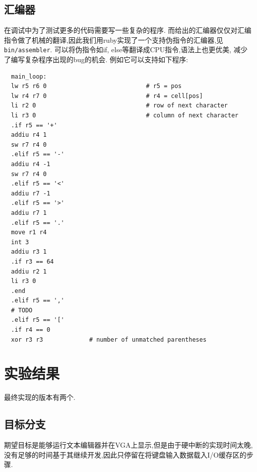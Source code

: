 \subsection{汇编器}
在调试中为了测试更多的代码需要写一些复杂的程序.
而给出的汇编器仅仅对汇编指令做了机械的翻译,因此我们用ruby实现了一个支持伪指令的汇编器,见\verb|bin/assembler|.
可以将伪指令如if, else等翻译成CPU指令,语法上也更优美, 减少了编写复杂程序出现的bug的机会. 例如它可以支持如下程序:
\begin{lstlisting}
  main_loop:
  lw r5 r6 0                            # r5 = pos
  lw r4 r7 0                            # r4 = cell[pos]
  li r2 0                               # row of next character
  li r3 0                               # column of next character
  .if r5 == '+'
  addiu r4 1
  sw r7 r4 0
  .elif r5 == '-'
  addiu r4 -1
  sw r7 r4 0
  .elif r5 == '<'
  addiu r7 -1
  .elif r5 == '>'
  addiu r7 1
  .elif r5 == '.'
  move r1 r4
  int 3
  addiu r3 1
  .if r3 == 64
  addiu r2 1
  li r3 0
  .end
  .elif r5 == ','
  # TODO
  .elif r5 == '['
  .if r4 == 0
  xor r3 r3             # number of unmatched parentheses
\end{lstlisting}
\section{实验结果}
最终实现的版本有两个.
\subsection{目标分支}
期望目标是能够运行文本编辑器并在VGA上显示,但是由于硬中断的实现时间太晚,没有足够的时间基于其继续开发,因此只停留在将键盘输入数据载入I/O缓存区的步骤.
